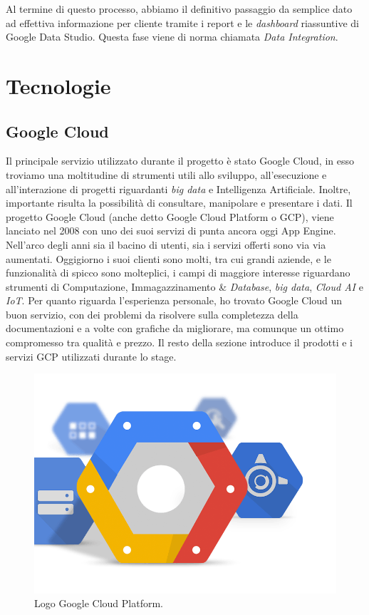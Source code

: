 Al termine di questo processo, abbiamo il definitivo passaggio da semplice dato ad effettiva informazione per cliente tramite i report e le \emph{dashboard} riassuntive di Google Data Studio. Questa fase viene di norma chiamata \emph{Data Integration}.

\section{Tecnologie}
\subsection{Google Cloud}\label{GoogleCloud}
Il principale servizio utilizzato durante il progetto è stato Google Cloud, in esso troviamo una moltitudine di strumenti utili allo sviluppo, all'esecuzione e all'interazione di progetti riguardanti \emph{big data} e Intelligenza Artificiale. Inoltre, importante risulta la possibilità di consultare, manipolare e presentare i dati.
Il progetto Google Cloud (anche detto Google Cloud Platform o GCP), viene lanciato nel 2008 con uno dei suoi servizi di punta ancora oggi  \Gls{App Engine}. Nell'arco degli anni sia il bacino di utenti, sia i servizi offerti sono via via aumentati. Oggigiorno i suoi clienti \cite{clienti} sono molti, tra cui grandi aziende, e le funzionalità di spicco sono molteplici, i campi di maggiore interesse riguardano strumenti di Computazione, Immagazzinamento \& \emph{Database}, \emph{big data}, \emph{Cloud AI} e \emph{IoT}.
Per quanto riguarda l'esperienza personale, ho trovato Google Cloud un buon servizio, con dei problemi da risolvere sulla completezza della documentazioni e a volte con grafiche da migliorare, ma comunque un ottimo compromesso tra qualità e prezzo.
Il resto della sezione introduce il prodotti e i servizi GCP utilizzati durante lo stage.
\begin{figure}
	\centering
	\includegraphics[scale=0.3]{figures/google-cloud-platform}
	\caption[Logo Google Cloud Platform.]{Logo Google Cloud Platform.
		\label{fig:logoGCP}}
\end{figure}	
